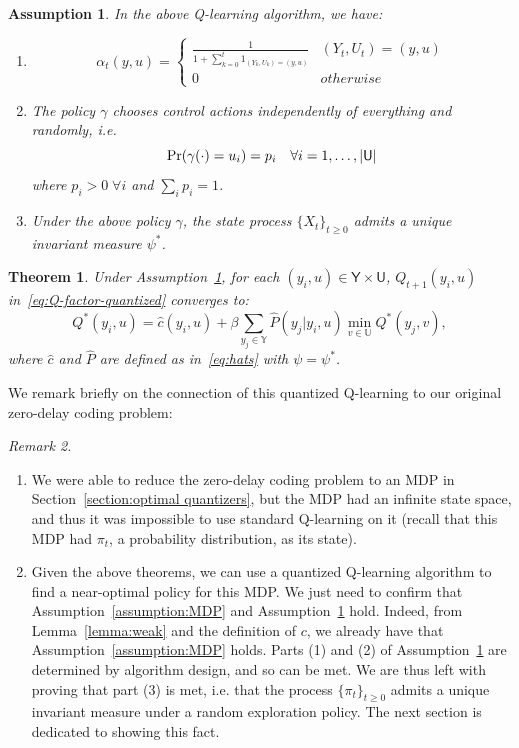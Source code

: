 \documentclass[conference, draftcls, onecolumn]{IEEEtran}
\newtheorem{theorem}{Theorem}
\newtheorem{assumption}{Assumption}
\begin{document}
\begin{assumption}\label{assumption:Q-learning} In the above Q-learning algorithm, we have:
    \begin{enumerate}
        \item \[\alpha_t(y,u) = \begin{cases}
                      \frac{1}{1 + \sum_{k=0}^t 1_{(Y_k,U_k) = (y,u)}} & (Y_t,U_t) = (y,u) \\
                      0                                                & otherwise
                  \end{cases}\]
        \item The policy \(\gamma\) chooses control actions independently of everything and randomly, i.e.
              \[ \textup{Pr}(\gamma(\cdot) = u_i) = p_i \quad \forall i = 1,\ldots,|\mathsf{U}| \]
              where \(p_i > 0 \; \forall i\) and \(\sum_i p_i = 1\).
        \item Under the above policy \(\gamma\), the state process \(\{X_t\}_{t\ge0}\) admits a unique invariant measure \(\psi^*\).
    \end{enumerate}
\end{assumption}

\begin{theorem}\label{theorem:convergence}\cite[Theorem 3.2]{Kara}
    Under Assumption~\ref{assumption:Q-learning}, for each \((y_i,u) \in \mathsf{Y} \times \mathsf{U}\), \(Q_{t+1}(y_i, u)\) in~\eqref{eq:Q-factor-quantized} converges to:
    \[ Q^*(y_i,u) = \hat{c}(y_i,u) + \beta \sum_{y_j \in \mathbb{Y}}\hat{P}(y_j | y_i,u)\min_{v \in \mathbb{U}}Q^*(y_j,v), \]
    where \(\hat{c}\) and \(\hat{P}\) are defined as in~\eqref{eq:hats} with \(\psi = \psi^*\).
\end{theorem}

We remark briefly on the connection of this quantized Q-learning to our original zero-delay coding problem:

\vspace{1em}
\noindent\emph{Remark 2.}\label{remark:2}
\begin{enumerate}[wide, labelwidth=!, labelindent=0pt]
    \item We were able to reduce the zero-delay coding problem to an MDP in Section~\ref{section:optimal quantizers}, but the MDP had an infinite state space, and thus it was impossible to use standard Q-learning on it (recall that this MDP had \(\pi_t\), a probability distribution, as its state).
    \item Given the above theorems, we can use a quantized Q-learning algorithm to find a near-optimal policy for this MDP. We just need to confirm that Assumption~\ref{assumption:MDP} and Assumption~\ref{assumption:Q-learning} hold. Indeed, from Lemma~\ref{lemma:weak} and the definition of \(c\), we already have that Assumption~\ref{assumption:MDP} holds. Parts (1) and (2) of Assumption~\ref{assumption:Q-learning} are determined by algorithm design, and so can be met. We are thus left with proving that part (3) is met, i.e. that the process \(\{\pi_t\}_{t\ge0}\) admits a unique invariant measure under a random exploration policy. The next section is dedicated to showing this fact.
\end{enumerate}
\end{document}
